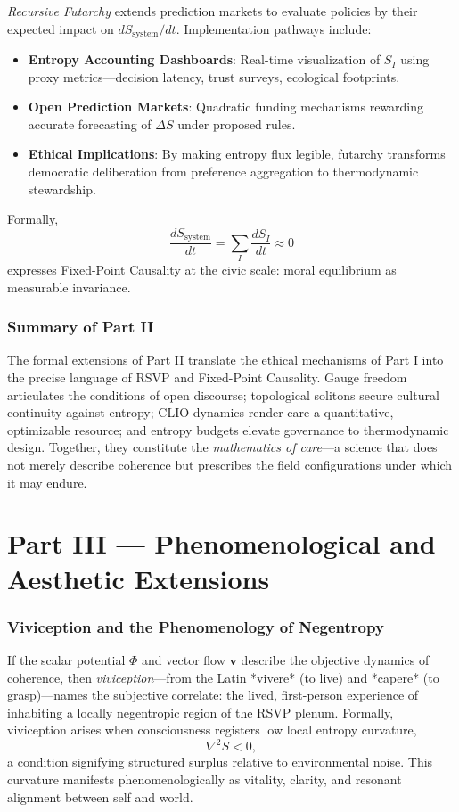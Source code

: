 \documentclass[12pt,a4paper]{article}
\begin{document}
\emph{Recursive Futarchy} extends prediction markets to evaluate policies by their expected impact on $dS_{\text{system}}/dt$. Implementation pathways include:
\begin{itemize}
\item \textbf{Entropy Accounting Dashboards}: Real-time visualization of $S_I$ using proxy metrics—decision latency, trust surveys, ecological footprints.
\item \textbf{Open Prediction Markets}: Quadratic funding mechanisms rewarding accurate forecasting of $\Delta S$ under proposed rules.
\item \textbf{Ethical Implications}: By making entropy flux legible, futarchy transforms democratic deliberation from preference aggregation to thermodynamic stewardship.
\end{itemize}

Formally,
\begin{equation}
\frac{dS_{\text{system}}}{dt} = \sum_I \frac{dS_I}{dt} \approx 0
\label{eq:fpc-civic}
\end{equation}
expresses Fixed-Point Causality at the civic scale: moral equilibrium as measurable invariance.

\section*{Summary of Part II}
The formal extensions of Part II translate the ethical mechanisms of Part I into the precise language of RSVP and Fixed-Point Causality. Gauge freedom articulates the conditions of open discourse; topological solitons secure cultural continuity against entropy; CLIO dynamics render care a quantitative, optimizable resource; and entropy budgets elevate governance to thermodynamic design. Together, they constitute the \emph{mathematics of care}—a science that does not merely describe coherence but prescribes the field configurations under which it may endure.

\clearpage
\part{Part III — Phenomenological and Aesthetic Extensions}

\section{Viviception and the Phenomenology of Negentropy}
If the scalar potential $\Phi$ and vector flow $\bm{v}$ describe the objective dynamics of coherence, then \emph{viviception}—from the Latin *vivere* (to live) and *capere* (to grasp)—names the subjective correlate: the lived, first-person experience of inhabiting a locally negentropic region of the RSVP plenum. Formally, viviception arises when consciousness registers low local entropy curvature,
\begin{equation}
\nabla^2 S < 0,
\label{eq:viviception}
\end{equation}
a condition signifying structured surplus relative to environmental noise. This curvature manifests phenomenologically as vitality, clarity, and resonant alignment between self and world.
\end{document}
